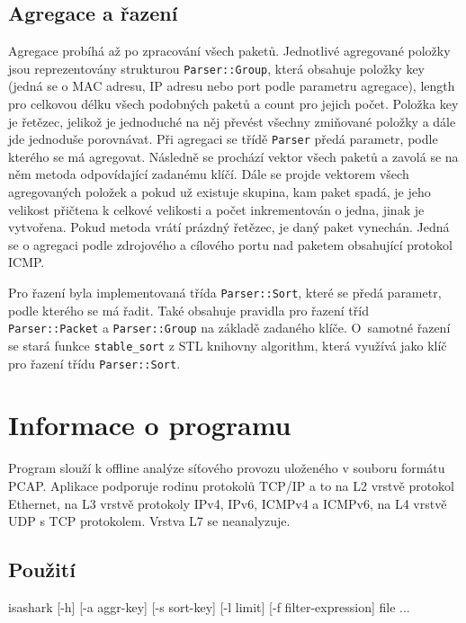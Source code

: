 \documentclass[11pt, a4paper]{article}
\begin{document}
\subsection{Agregace a řazení}

Agregace probíhá až po zpracování všech paketů. Jednotlivé agregované položky jsou reprezentovány strukturou \texttt{Parser::Group}, která obsahuje položky key (jedná se o MAC adresu, IP adresu nebo port podle parametru agregace), length pro celkovou délku všech podobných paketů a count pro jejich počet. Položka key je řetězec, jelikož je jednoduché na něj převést všechny zmiňované položky a dále jde jednoduše porovnávat. Při agregaci se třídě \texttt{Parser} předá parametr, podle kterého se má agregovat. Následně se prochází vektor všech paketů a zavolá se na něm metoda odpovídající zadanému klíčí. Dále se projde vektorem všech agregovaných položek a pokud už existuje skupina, kam paket spadá, je jeho velikost přičtena k celkové velikosti a počet inkrementován o jedna, jinak je vytvořena. Pokud metoda vrátí prázdný řetězec, je daný paket vynechán. Jedná se o agregaci podle zdrojového a cílového portu nad paketem obsahující protokol ICMP.

Pro řazení byla implementovaná třída \texttt{Parser::Sort}, které se předá parametr, podle kterého se má řa\-dit. Také obsahuje pravidla pro řazení tříd \texttt{Parser::Packet} a \texttt{Parser::Group} na základě zadaného klíče. O~samotné řa\-ze\-ní se sta\-rá funk\-ce \texttt{stable\_sort} z STL knihovny algorithm, která vy\-u\-ží\-vá jako klíč pro řazení třídu \texttt{Parser::Sort}.

\newpage

\section{Informace o programu}

Program slouží k offline analýze síťového provozu uloženého v souboru formátu PCAP. 
Aplikace podporuje rodinu protokolů TCP/IP a to na L2 vrstvě protokol Ethernet, na L3 vrstvě protokoly IPv4, IPv6, ICMPv4 a ICMPv6, na L4 vrstvě UDP s TCP protokolem. 
Vrstva L7 se neanalyzuje.

\subsection{Použití}

isashark [-h] [-a aggr-key] [-s sort-key] [-l limit] [-f filter-expression] file ...
\end{document}

